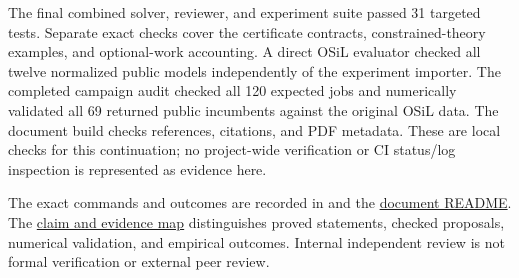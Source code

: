 The final combined solver, reviewer, and experiment suite passed 31
targeted tests. Separate exact checks cover the certificate contracts,
constrained-theory examples, and optional-work accounting. A direct
OSiL evaluator checked all twelve normalized public models independently
of the experiment importer. The completed campaign audit checked all
120 expected jobs and numerically validated all 69 returned public
incumbents against the original OSiL data. The document build checks
references, citations, and PDF metadata. These are local checks for this
continuation; no project-wide verification or CI status/log inspection
is represented as evidence here.

The exact commands and outcomes are recorded in
 and the
\href{run:README.md}{document README}. The
\href{run:COVERAGE.md}{claim and evidence map} distinguishes proved
statements, checked proposals, numerical validation, and empirical
outcomes. Internal independent review is not formal verification or
external peer review.
